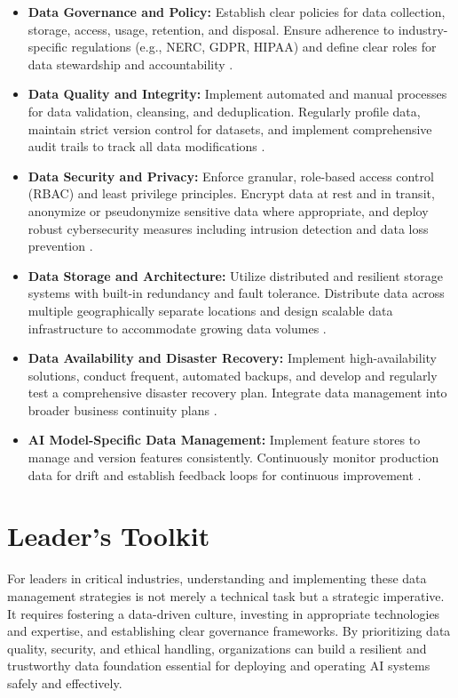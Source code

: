\begin{itemize}
    \item \textbf{Data Governance and Policy:} Establish clear policies for data collection, storage, access, usage, retention, and disposal. Ensure adherence to industry-specific regulations (e.g., NERC, GDPR, HIPAA) and define clear roles for data stewardship and accountability \parencite{NIST2020DataManagement}.
    \item \textbf{Data Quality and Integrity:} Implement automated and manual processes for data validation, cleansing, and deduplication. Regularly profile data, maintain strict version control for datasets, and implement comprehensive audit trails to track all data modifications \parencite{HPE2023}.
    \item \textbf{Data Security and Privacy:} Enforce granular, role-based access control (RBAC) and least privilege principles. Encrypt data at rest and in transit, anonymize or pseudonymize sensitive data where appropriate, and deploy robust cybersecurity measures including intrusion detection and data loss prevention \parencite{EWsolutions2023}.
    \item \textbf{Data Storage and Architecture:} Utilize distributed and resilient storage systems with built-in redundancy and fault tolerance. Distribute data across multiple geographically separate locations and design scalable data infrastructure to accommodate growing data volumes \parencite{Komprise2023}.
    \item \textbf{Data Availability and Disaster Recovery:} Implement high-availability solutions, conduct frequent, automated backups, and develop and regularly test a comprehensive disaster recovery plan. Integrate data management into broader business continuity plans \parencite{NomaSecurity2023}.
    \item \textbf{AI Model-Specific Data Management:} Implement feature stores to manage and version features consistently. Continuously monitor production data for drift and establish feedback loops for continuous improvement \parencite{Lumenalta2023}.
\end{itemize}

\section{Leader's Toolkit}
\label{sec:data_leaders_toolkit}
For leaders in critical industries, understanding and implementing these data management strategies is not merely a technical task but a strategic imperative. It requires fostering a data-driven culture, investing in appropriate technologies and expertise, and establishing clear governance frameworks. By prioritizing data quality, security, and ethical handling, organizations can build a resilient and trustworthy data foundation essential for deploying and operating AI systems safely and effectively.